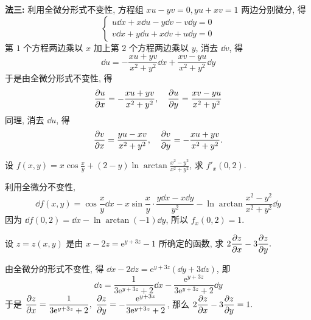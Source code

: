 \begin{solution}
$$    $$
    \textbf{法三: }利用全微分形式不变性, 方程组 $ x u-y v=0, y u+x v=1 $ 两边分别微分, 得
    $$
        \begin{cases}
            u \dd  x+x \dd  u-y \dd  v-v \dd  y=0 \\
            v \dd  x+y \dd  u+x \dd  v+u \dd  y=0
        \end{cases}
    $$
    第 $1$ 个方程两边乘以 $ x $ 加上第 $2$ 个方程两边乘以 $ y $, 消去 $ \dd v $, 得
    $$\dd u=-\frac{x u+y v}{x^{2}+y^{2}} \dd  x+\frac{x v-y u}{x^{2}+y^{2}} \dd  y $$
    于是由全微分形式不变性, 得
    $$
        \pdv{u}{x}=-\dfrac{xu+yv}{x^2+y^2},\quad\pdv{u}{y}=\dfrac{xv-yu}{x^2+y^2}
    $$
    同理, 消去 $\dd u$, 得
    $$\pdv{v}{x}=\dfrac{yu-xv}{x^2+y^2},\quad \pdv{v}{y}=-\dfrac{xu+yv}{x^2+y^2}.$$
\end{solution}

\begin{example}
    设 $\displaystyle f(x,y)=x\cos\frac{x}{y}+(2-y)\ln\arctan\frac{x^2-y^2}{x^2+y^2}$, 求 $f'_x(0,2).$
\end{example}
\begin{solution}
    利用全微分不变性,
    $$\dd f(x,y)=\cos\frac{x}{y}\dd x-x\sin\frac{x}{y}\cdot\frac{y\dd x-x\dd y}{y^2}-\ln\arctan\frac{x^2-y^2}{x^2+y^2}\dd y$$
    因为 $\dd f(0,2)=\dd x-\ln\arctan(-1)\dd y$, 所以 $f_x(0,2)=1$.
\end{solution}

\begin{example}
    设 $z=z(x,y)$ 是由 $x-2z=\mathrm{e}^{y+3z}-1$ 所确定的函数, 求 $\displaystyle 2\pdv{z}{x}-3\pdv{z}{y}.$
\end{example}
\begin{solution}
    由全微分的形式不变性, 得 $\dd x-2\dd z=\mathrm{e}^{y+3z}(\dd y+3\dd z)$, 即
    $$\dd z=\dfrac{1}{3\mathrm{e}^{y+3z}+2}\dd x-\dfrac{\mathrm{e}^{y+3z}}{3\mathrm{e}^{y+3z}+2}\dd y$$
    于是 $\displaystyle\pdv{z}{x}=\dfrac{1}{3\mathrm{e}^{y+3z}+2},~\pdv{z}{y}=-\dfrac{\mathrm{e}^{y+3z}}{3\mathrm{e}^{y+3z}+2}$, 那么 $\displaystyle 2\pdv{z}{x}-3\pdv{z}{y}=1.$
\end{solution}



